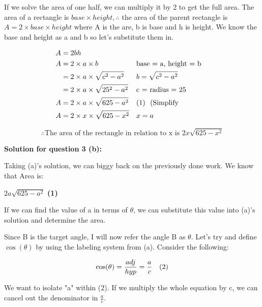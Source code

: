 \documentclass[12pt]{book}
\begin{document}
\begin{enumerate}
\vspace{0.3cm}
If we solve the area of one half, we can multiply it by 2 to get the full area. 
The area of a rectangle is $base \times height, \therefore$ the area of the parent rectangle 
is $A = 2\times base \times height$ where A is the are, b is base and h is height. We know the base and height as a and b 
so let's substitute them in. 

\begin{align*}
    A &= 2bh \\
    A &= 2\times a \times b && \text{base = a, height = b} \\
    &= 2\times a \times \sqrt{c^2 - a^2} && b = \sqrt{c^2 - a^2} \\
    &= 2\times a \times \sqrt{25^2 - a^2} && \text{c = radius = 25} \\
    A &= 2\times a \times \sqrt{625 - a^2} && \text{(1) \space (Simplify} \\
    A &= 2\times x \times \sqrt{625 - x^2} && x=a \\
\end{align*}

\vspace{-1cm}
$$\boxed{\therefore \text{The area of the rectangle in relation to x is } 2x\sqrt{625 - x^2}}$$

\vspace{0.5cm}
\textbf{Solution for question 3 (b):}

\vspace{0.3cm}
Taking (a)'s solution, we can biggy back on the previously done work. We know that 
Area is:

\begin{center}
    $2a\sqrt{625 - a^2}$ \textbf{(1)} 
\end{center}

\vspace{0.2cm}
If we can find the value of a in terms of $\theta$, 
we can substitute this value into (a)'s solution and determine the area.

\vspace{0.3cm}
Since B is the target angle, I will now refer the angle B as $\theta$. 
Let's try and define $\cos(\theta)$ by using the labeling system from (a). 
Consider the following:

$$\cos(\theta) = \frac{adj}{hyp} = \frac{a}{c} \text{\space \space \space (2)}$$

We want to isolate "a" within (2). If we multiply the whole equation by c, we can 
cancel out the denominator in $\frac{a}{c}$.


\end{enumerate}
\end{document}
